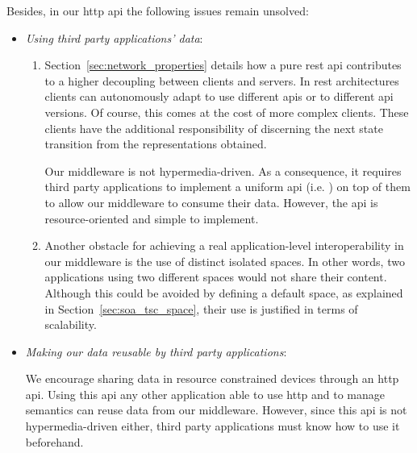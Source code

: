 Besides, in our \ac{http} \ac{api} the following issues remain unsolved:
\begin{itemize} %
  \item \emph{Using third party applications' data}:
  \begin{enumerate}
    \item Section~\ref{sec:network_properties} details how a pure \ac{rest} \ac{api} contributes to a higher decoupling between clients and servers.
	  In \ac{rest} architectures clients can autonomously adapt to use different \acp{api} or to different \ac{api} versions. %
	  Of course, this comes at the cost of more complex clients.
	  These clients have the additional responsibility of discerning the next state transition from the representations obtained. %
	  
	  Our middleware is not hypermedia-driven.
	  As a consequence, it requires third party applications to implement a uniform \ac{api} (i.e. \osapi{}) on top of them to allow our middleware to consume their data.
	  However, the \ac{api} is resource-oriented and simple to implement.
	  
    \item Another obstacle for achieving a real application-level interoperability in our middleware is the use of distinct isolated spaces.
	  In other words, two applications using two different spaces would not share their content.
	  Although this could be avoided by defining a default space, as explained in Section~\ref{sec:soa_tsc_space}, their use is justified in terms of scalability.
  \end{enumerate}
  
  \item \emph{Making our data reusable by third party applications}:
	
	We encourage sharing data in resource constrained devices through an \ac{http} \ac{api}.
	Using this \ac{api} any other application able to use \ac{http} and to manage semantics can reuse data from our middleware.
	However, since this \ac{api} is not hypermedia-driven either, 
	third party applications must know how to use it beforehand. %
\end{itemize}


